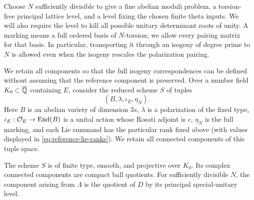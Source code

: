 Choose \(N\) sufficiently divisible to give a fine abelian moduli
problem, a torsion-free principal lattice level, and a level fixing
the chosen finite theta inputs.  We will also require the level to
kill all possible unitary determinant roots of unity.  A marking
means a full ordered basis of \(N\)-torsion; we allow every pairing
matrix for that basis.  In particular, transporting it through an
isogeny of degree prime to \(N\) is allowed even when the isogeny
rescales the polarization pairing.

We retain all components so that the full isogeny correspondences can
be defined without assuming that the reference component is preserved.
Over a number field \(K_0\subset\overline{\mathbb{Q}}\) containing \(E\), consider the
reduced scheme \(S\) of tuples
\[
(B,\lambda,\iota_E,\eta_N).
\]
Here \(B\) is an abelian variety of dimension \(3s\), \(\lambda\) is
a polarization of the fixed type,
\(\iota_E:\mathcal O_E\to\operatorname{End}(B)\) is a unital action whose Rosati
adjoint is \(c\), \(\eta_N\) is the full marking, and each Lie
summand has the particular rank fixed above (with values displayed
in \eqref{eq:reference-lie-ranks}).  We retain all connected
components of this tuple space.

\begin{lemma}\label{lem:reference-moduli}
The scheme \(S\) is of finite type, smooth, and projective over \(K_0\).
Its complex connected components are compact ball quotients.  For
sufficiently divisible \(N\), the component arising from \(\Lambda\)
is the quotient of \(D\) by its principal special-unitary level.
\end{lemma}

